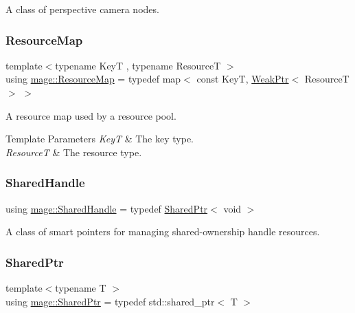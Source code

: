 A class of perspective camera nodes. \hypertarget{namespacemage_a3aaea9153b9e896914d7a1155d8c7bbe}{}\label{namespacemage_a3aaea9153b9e896914d7a1155d8c7bbe} 
\subsubsection{\texorpdfstring{Resource\+Map}{ResourceMap}}
{\footnotesize\ttfamily template$<$typename KeyT , typename ResourceT $>$ \\
using \hyperlink{namespacemage_a3aaea9153b9e896914d7a1155d8c7bbe}{mage\+::\+Resource\+Map} = typedef map$<$ const KeyT, \hyperlink{namespacemage_aa159a63c0d58464bdf32dfe419dd5dc1}{Weak\+Ptr}$<$ ResourceT $>$ $>$}

A resource map used by a resource pool.


\begin{DoxyTemplParams}{Template Parameters}
{\em KeyT} & The key type. \\
\hline
{\em ResourceT} & The resource type. \\
\hline
\end{DoxyTemplParams}
\hypertarget{namespacemage_ae70b3368a2dccc985c4ecbdf15a1a3c9}{}\label{namespacemage_ae70b3368a2dccc985c4ecbdf15a1a3c9} 
\subsubsection{\texorpdfstring{Shared\+Handle}{SharedHandle}}
{\footnotesize\ttfamily using \hyperlink{namespacemage_ae70b3368a2dccc985c4ecbdf15a1a3c9}{mage\+::\+Shared\+Handle} = typedef \hyperlink{namespacemage_a1e01ae66713838a7a67d30e44c67703e}{Shared\+Ptr}$<$ void $>$}

A class of smart pointers for managing shared-\/ownership handle resources. \hypertarget{namespacemage_a1e01ae66713838a7a67d30e44c67703e}{}\label{namespacemage_a1e01ae66713838a7a67d30e44c67703e} 
\subsubsection{\texorpdfstring{Shared\+Ptr}{SharedPtr}}
{\footnotesize\ttfamily template$<$typename T $>$ \\
using \hyperlink{namespacemage_a1e01ae66713838a7a67d30e44c67703e}{mage\+::\+Shared\+Ptr} = typedef std\+::shared\+\_\+ptr$<$ T $>$}

